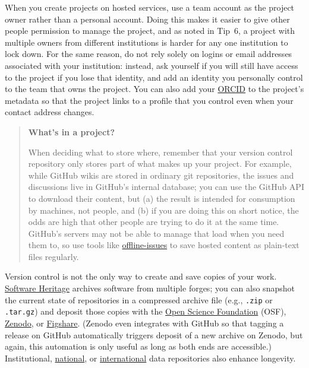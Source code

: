 \documentclass[10pt,letterpaper]{article}
\begin{document}
When you create projects on hosted services, use a team account as the project owner rather than a personal account.
Doing this makes it easier to give other people permission to manage the project,
and as noted in Tip~6, a project with multiple owners from different institutions is harder for any one institution to lock down.
For the same reason, do not rely solely on logins or email addresses associated with your institution: instead, ask yourself if you will still have access to the project if you lose that identity, and add an identity you personally control to the team that owns the project.
You can also add your \href{https://orcid.org/}{ORCID} to the project's metadata
so that the project links to a profile that you control
even when your contact address changes.

\begin{quote}
  \noindent
  \textbf{What's in a project?}

  When deciding what to store where, remember that your version control repository only stores part of what makes up your project.
  For example, while GitHub wikis are stored in ordinary git repositories, the issues and discussions live in GitHub's internal database; you can use the GitHub API to download their content, but (a) the result is intended for consumption by machines, not people, and (b) if you are doing this on short notice, the odds are high that other people are trying to do it at the same time.
  GitHub's servers may not be able to manage that load when you need them to, so use tools like \href{https://github.com/jlord/offline-issues}{offline-issues} to save hosted content as plain-text files regularly.
\end{quote}

Version control is not the only way to create and save copies of your work. \href{https://www.softwareheritage.org/how-to-archive-reference-code/}{Software Heritage} archives software from multiple forges; you can also snapshot the current state of repositories in a compressed archive file (e.g., \texttt{.zip} or \texttt{.tar.gz}) and deposit those copies with the \href{https://osf.io/}{Open Science Foundation} (OSF), \href{https://zenodo.org/}{Zenodo}, or \href{https://figshare.com/}{Figshare}.
(Zenodo even integrates with GitHub so that tagging a release on GitHub
automatically triggers deposit of a new archive on Zenodo, but again, this automation is only useful as long as both ends are accessible.)
Institutional, \href{https://amt.coretrustseal.org/certificates/}{national},
or \href{https://safeguar.de/}{international} data repositories also enhance longevity.
\end{document}
